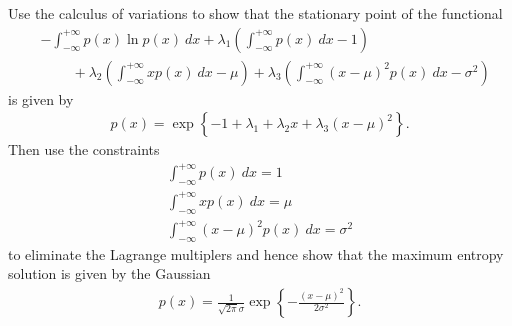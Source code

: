\begin{question}{1.34}
	Use the calculus of variations to show that the stationary point of the functional
	\begin{align*}
		&- \int_{-\infty}^{+\infty} p(x) \ln p(x)\ dx + \lambda_1 \left( \int_{-\infty}^{+\infty} p(x)\ dx - 1 \right)\\
		&\phantom{-}\quad + \lambda_2 \left( \int_{-\infty}^{+\infty} xp(x)\ dx - \mu \right) + \lambda_3\left( \int_{-\infty}^{+\infty} (x-\mu)^2p(x)\ dx - \sigma^2 \right)
	\end{align*}
	is given by
	\begin{align*}
		p(x) = \exp\left\{ -1 + \lambda_1 + \lambda_2x + \lambda_3(x - \mu)^2 \right\}.
	\end{align*}
	Then use the constraints
	\begin{gather*}
		\int_{-\infty}^{+\infty} p(x)\ dx = 1\\
		\int_{-\infty}^{+\infty} xp(x)\ dx = \mu\\
		\int_{-\infty}^{+\infty} (x-\mu)^2p(x)\ dx = \sigma^2
	\end{gather*}
	to eliminate the Lagrange multiplers and hence show that the maximum entropy solution is given by the Gaussian
	\begin{align*}
		p(x) = \frac{1}{\sqrt{2\pi}\sigma} \exp\left\{ -\frac{(x- \mu)^2}{2\sigma^2} \right\}.
	\end{align*}
\end{question}

